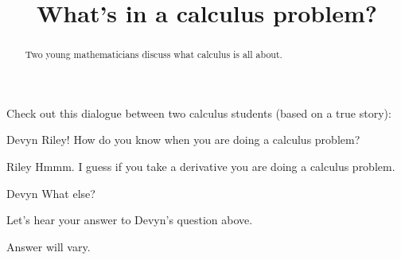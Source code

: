 \documentclass{ximera}
\title[Break-Ground:]{What's in a calculus problem?}
\begin{document}
\begin{abstract}
Two young mathematicians discuss what calculus is all about.
\end{abstract}
\maketitle


Check out this dialogue between two calculus students (based on a true
story):

\begin{dialogue}
\item[Devyn] Riley! How do you know when you are doing a calculus problem?
\item[Riley] Hmmm. I guess if you take a derivative you are doing a calculus problem.
\item[Devyn] What else?
\end{dialogue}

\begin{problem}
  Let's hear your answer to Devyn's question above.
  \begin{freeResponse}
    Answer will vary.
  \end{freeResponse}
\end{problem}




\end{document}
